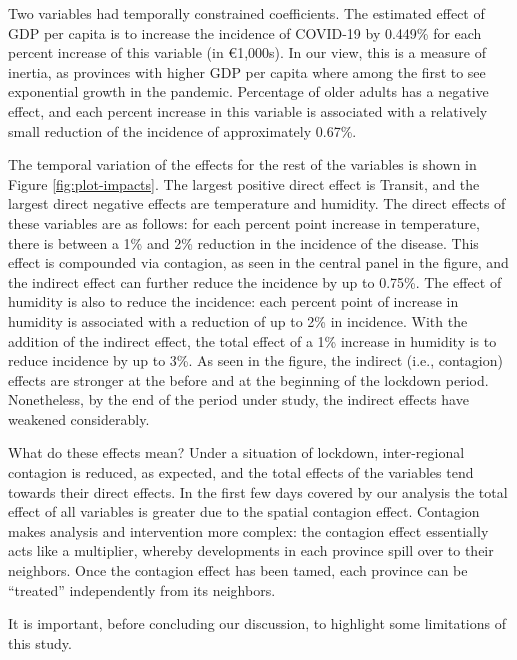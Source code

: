 \documentclass[]{elsarticle} %
\begin{document}
Two variables had temporally constrained coefficients. The estimated
effect of GDP per capita is to increase the incidence of COVID-19 by
0.449\% for each percent increase of this variable (in €1,000s). In our
view, this is a measure of inertia, as provinces with higher GDP per
capita where among the first to see exponential growth in the pandemic.
Percentage of older adults has a negative effect, and each percent
increase in this variable is associated with a relatively small
reduction of the incidence of approximately 0.67\%.

The temporal variation of the effects for the rest of the variables is
shown in Figure \ref{fig:plot-impacts}. The largest positive direct
effect is Transit, and the largest direct negative effects are
temperature and humidity. The direct effects of these variables are as
follows: for each percent point increase in temperature, there is
between a 1\% and 2\% reduction in the incidence of the disease. This
effect is compounded via contagion, as seen in the central panel in the
figure, and the indirect effect can further reduce the incidence by up
to 0.75\%. The effect of humidity is also to reduce the incidence: each
percent point of increase in humidity is associated with a reduction of
up to 2\% in incidence. With the addition of the indirect effect, the
total effect of a 1\% increase in humidity is to reduce incidence by up
to 3\%. As seen in the figure, the indirect (i.e., contagion) effects
are stronger at the before and at the beginning of the lockdown period.
Nonetheless, by the end of the period under study, the indirect effects
have weakened considerably.

What do these effects mean? Under a situation of lockdown,
inter-regional contagion is reduced, as expected, and the total effects
of the variables tend towards their direct effects. In the first few
days covered by our analysis the total effect of all variables is
greater due to the spatial contagion effect. Contagion makes analysis
and intervention more complex: the contagion effect essentially acts
like a multiplier, whereby developments in each province spill over to
their neighbors. Once the contagion effect has been tamed, each province
can be ``treated'' independently from its neighbors.

It is important, before concluding our discussion, to highlight some
limitations of this study.
\end{document}
